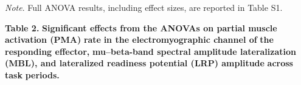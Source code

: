 \begin{center}\small
{}
\end{center}
\emph{Note}. Full ANOVA results, including effect sizes, are reported in Table S1.

\textbf{Table 2}\textbf{.} \textbf{Significant effects from the ANOVAs on partial muscle activation (PMA)} \textbf{rate} \textbf{in the electromy}\textbf{ographic channel of} \textbf{the responding effector}\textbf{,} \textbf{mu--beta-band spectral amplitude lateralization (MBL)}\textbf{, and lateralized readiness potential (LRP) amplitude} \textbf{across}  \textbf{task} \textbf{period}\textbf{s}\textbf{.}

